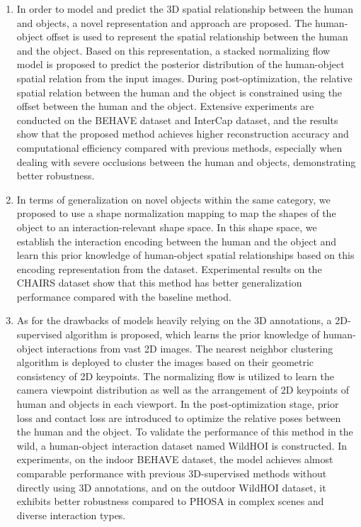 \begin{abstract*}[flattitle]
\begin{enumerate}
    \item In order to model and predict the 3D spatial relationship between the human and objects, a novel representation and approach are proposed. The human-object offset is used to represent the spatial relationship between the human and the object. Based on this representation, a stacked normalizing flow model is proposed to predict the posterior distribution of the human-object spatial relation from the input images. During post-optimization, the relative spatial relation between the human and the object is constrained using the offset between the human and the object. Extensive experiments are conducted on the BEHAVE dataset and InterCap dataset, and the results show that the proposed method achieves higher reconstruction accuracy and computational efficiency compared with previous methods, especially when dealing with severe occlusions between the human and objects, demonstrating better robustness.
    \item In terms of generalization on novel objects within the same category, we proposed to use a shape normalization mapping to map the shapes of the object to an interaction-relevant shape space. In this shape space, we establish the interaction encoding between the human and the object and learn this prior knowledge of human-object spatial relationships based on this encoding representation from the dataset. Experimental results on the CHAIRS dataset show that this method has better generalization performance compared with the baseline method.
    \item As for the drawbacks of models heavily relying on the 3D annotations, a 2D-supervised algorithm is proposed, which learns the prior knowledge of human-object interactions from vast 2D images. The nearest neighbor clustering algorithm is deployed to cluster the images based on their geometric consistency of 2D keypoints. The normalizing flow is utilized to learn the camera viewpoint distribution as well as the arrangement of 2D keypoints of human and objects in each viewport. In the post-optimization stage, prior loss and contact loss are introduced to optimize the relative poses between the human and the object. To validate the performance of this method in the wild, a human-object interaction dataset named WildHOI is constructed. In experiments, on the indoor BEHAVE dataset, the model achieves almost comparable performance with previous 3D-supervised methods without directly using 3D annotations, and on the outdoor WildHOI dataset, it exhibits better robustness compared to PHOSA in complex scenes and diverse interaction types.
\end{enumerate}
\end{abstract*}